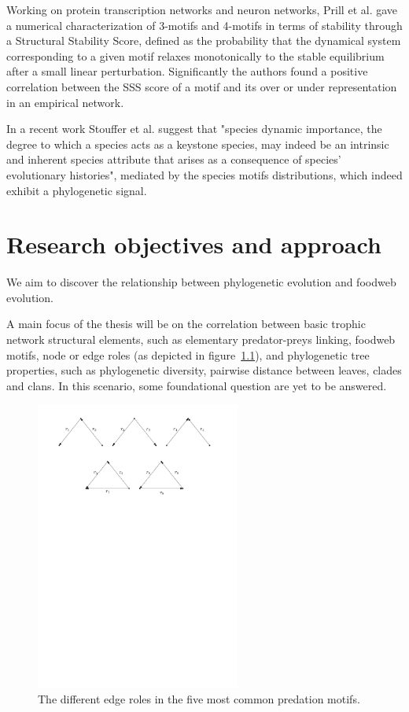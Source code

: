 \documentclass[12pt,a4paper]{report}
\begin{document}
Working on protein transcription networks and neuron networks, Prill et al. \cite{prill2005dynamic} gave a numerical characterization of 3-motifs and 4-motifs in terms of stability through a Structural Stability Score, defined as the probability that the dynamical system corresponding to a given motif relaxes monotonically to the stable equilibrium after a small linear perturbation. Significantly the authors found a positive correlation between the SSS score of a motif and its over or under representation in an empirical network.

In a recent work \cite{stouffer_evolutionary_2012} Stouffer et al. suggest that "species dynamic importance, the degree to which a species acts as a keystone species, may indeed be an intrinsic and inherent species attribute that arises as a consequence of species’ evolutionary histories", mediated by the species motifs distributions, which indeed exhibit a phylogenetic signal.

\chapter{Research objectives and approach}

We aim to discover the relationship between phylogenetic evolution and foodweb evolution.

A main focus of the thesis will be on the correlation between basic trophic network structural elements, such as elementary predator-preys linking, foodweb motifs, node or edge roles (as depicted in figure~\ref{fig:motifs}), and phylogenetic tree properties, such as phylogenetic diversity, pairwise distance between leaves, clades and clans. In this scenario, some foundational question are yet to be answered.

\begin{figure}[ht]
	\centering
		\includegraphics[width=0.6\textwidth]{images/motifs}
		\caption{The different edge roles in the five most common predation motifs.}
		\label{fig:motifs}
\end{figure}
\end{document}
